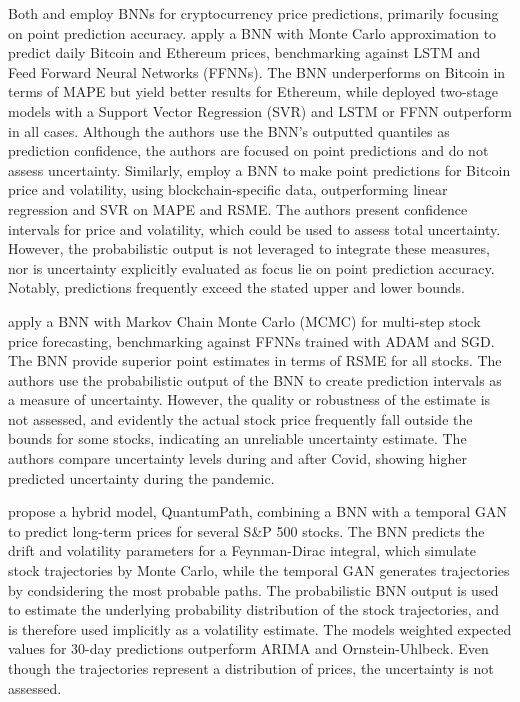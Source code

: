 Both \textcite{cocco2021predictions} and \textcite{jang2018empirical} employ BNNs for cryptocurrency price predictions, primarily focusing on point prediction accuracy. \textcite{cocco2021predictions} apply a BNN with Monte Carlo approximation to predict daily Bitcoin and Ethereum prices, benchmarking against LSTM and Feed Forward Neural Networks (FFNNs). The BNN underperforms on Bitcoin in terms of MAPE but yield better results for Ethereum, while deployed two-stage models with a Support Vector Regression (SVR) and LSTM or FFNN outperform in all cases. Although the authors use the BNN's outputted quantiles as prediction confidence, the authors are focused on point predictions and do not assess uncertainty. Similarly, \textcite{jang2018empirical} employ a BNN to make point predictions for Bitcoin price and volatility, using blockchain-specific data, outperforming linear regression and SVR on MAPE and RSME. The authors present confidence intervals for price and volatility, which could be used to assess total uncertainty. However, the probabilistic output is not leveraged to integrate these measures, nor is uncertainty explicitly evaluated as focus lie on point prediction accuracy. Notably, predictions frequently exceed the stated upper and lower bounds. 

\textcite{chandra2021bayesian} apply a BNN with Markov Chain Monte Carlo (MCMC) for multi-step stock price forecasting, benchmarking against FFNNs trained with ADAM and SGD. The BNN provide superior point estimates in terms of RSME for all stocks. The authors use the probabilistic output of the BNN to create prediction intervals as a measure of uncertainty. However, the quality or robustness of the estimate is not assessed, and evidently the actual stock price frequently fall outside the bounds for some stocks, indicating an unreliable uncertainty estimate. The authors compare uncertainty levels during and after Covid, showing higher predicted uncertainty during the pandemic.

\textcite{soleymani2022longterm} propose a hybrid model, QuantumPath, combining a BNN with a temporal GAN to predict long-term prices for several S\&P 500 stocks. The BNN predicts the drift and volatility parameters for a Feynman-Dirac integral, which simulate stock trajectories by Monte Carlo, while the temporal GAN generates trajectories by condsidering the most probable paths. The probabilistic BNN output is used to estimate the underlying probability distribution of the stock trajectories, and is therefore used implicitly as a volatility estimate. The models weighted expected values for 30-day predictions outperform ARIMA and Ornstein-Uhlbeck. Even though the trajectories represent a distribution of prices, the uncertainty is not assessed.

